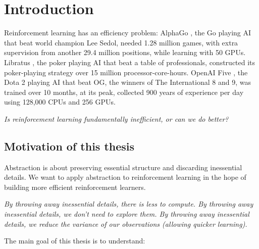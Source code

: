 \chapter{Introduction}\label{C:intro}

Reinforcement learning has an efficiency problem: AlphaGo \cite{Silver2016a}, the Go
playing AI that beat world champion Lee Sedol, needed 1.28 million games, with
extra supervision from another 29.4 million positions, while learning with 50 GPUs.
Libratus \cite{Brown2018b}, the poker playing AI that beat a table of professionals,
constructed its poker-playing strategy over 15 million processor-core-hours.
OpenAI Five \cite{Berner2019}, the Dota 2 playing AI that beat OG, the winners of The International 8 and 9, was
trained over 10 months, at its peak, collected 900 years of experience per day using
128,000 CPUs and 256 GPUs.

\begin{displayquote}
\textit{Is reinforcement learning fundamentally inefficient, or can we do better?}
\end{displayquote}


\section{Motivation of this thesis}

Abstraction is about preserving essential structure and discarding inessential details.
We want to apply abstraction to reinforcement learning in the hope of building more efficient reinforcement learners.

\begin{displayquote}
\textit{By throwing away inessential details, there is less to compute. \newline
By throwing away inessential details, we don't need to explore them. \newline
By throwing away inessential details, we reduce the variance of our \newline
observations (allowing quicker learning).}
\end{displayquote}

%
%
%

The main goal of this thesis is to understand:

